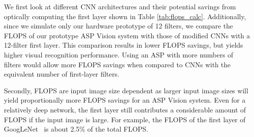 \documentclass[10pt,twocolumn,letterpaper]{article}
\begin{document}
We first look at different CNN architectures and their potential savings from optically computing the first layer shown in Table \ref{tab:flops_calc}. Additionally, since we simulate only our hardware prototype of 12 filters, we compare the FLOPS of our prototype ASP Vision system with those of modified CNNs with a 12-filter first layer. This comparison results in lower FLOPS savings, but yields higher visual recognition performance. Using an ASP with more numbers of filters would allow more FLOPS savings when compared to CNNs with the equivalent number of first-layer filters. 

Secondly, FLOPS are input image size dependent as larger input image sizes will yield proportionally more FLOPS savings for an ASP Vision system. Even for a relatively deep network, the first layer still contributes a considerable amount of FLOPS if the input image is large. For example, the FLOPS of the first layer of GoogLeNet~\cite{szegedy2014going} is about 2.5\% of the total FLOPS.
\end{document}
